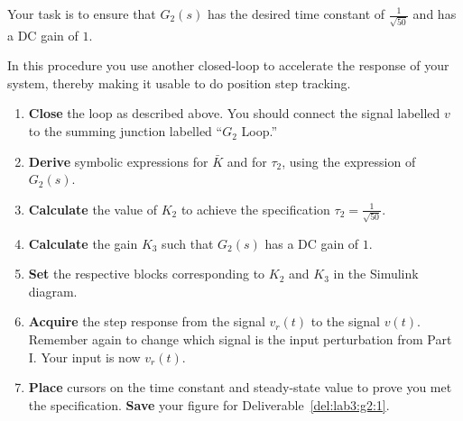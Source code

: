 Your task is to ensure that \(G_2(s)\) has the desired time constant of \(\frac{1}{\sqrt{50}}\) and has a DC gain of \(1.\)
%
\begin{procedure}[label={proc:lab3:speedup}]
  In this procedure you use another closed-loop to accelerate the response of your system, thereby making it usable to do position step tracking.
  \begin{enumerate}[label={(\arabic*)}]
    \item{%
      \textbf{Close} the loop as described above.
      You should connect the signal labelled \(v\) to the summing junction labelled ``\(G_2\) Loop.''%
    }
    \item{%
    \textbf{Derive} symbolic expressions for \(\bar{K}\) and for \(\tau_2\), using the expression of \(G_2(s)\).
    }
    \item{%
      \textbf{Calculate} the value of \(K_2\) to achieve the specification \(\tau_2 = \frac{1}{\sqrt{50}}.\)%
    }
    \item{%
      \textbf{Calculate} the gain \(K_3\) such that \(G_2(s)\) has a DC gain of \(1.\)%
    }
    \item{%
      \textbf{Set} the respective blocks corresponding to \(K_2\) and \(K_3\) in the Simulink diagram.%
    }
    \item{%
      \textbf{Acquire} the step response from the signal \(v_r(t)\) to the signal \(v(t).\)
      Remember again to change which signal is the input perturbation from Part I.
      Your input is now \(v_r(t).\)%
    }
    \item{%
      \textbf{Place} cursors on the time constant and steady-state value to prove you met the specification.
      \textbf{Save} your figure for Deliverable~\ref{del:lab3:g2:1}.%
    }
  \end{enumerate}
\end{procedure}

